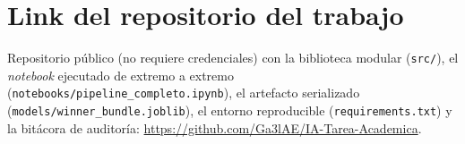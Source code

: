 \section{Link del repositorio del trabajo}
Repositorio público (no requiere credenciales) con la biblioteca modular (\texttt{src/}), el \textit{notebook} ejecutado de extremo a extremo (\texttt{notebooks/pipeline\_completo.ipynb}), el artefacto serializado (\texttt{models/winner\_bundle.joblib}), el entorno reproducible (\texttt{requirements.txt}) y la bitácora de auditoría: \url{https://github.com/Ga3lAE/IA-Tarea-Academica}.

